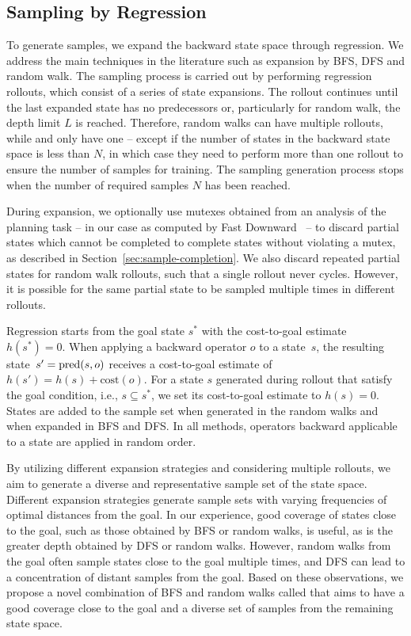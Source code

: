 \subsection{Sampling by Regression}
\label{sec:sampling-generation}

To generate samples, we expand the backward state space through regression. We address the main techniques in the literature such as expansion by BFS, DFS and random walk. The sampling process is carried out by performing regression rollouts, which consist of a series of state expansions. The rollout continues until the last expanded state has no predecessors or, particularly for random walk, the depth limit $L$ is reached. Therefore, random walks can have multiple rollouts, while \bfs and \dfs only have one -- except if the number of states in the backward state space is less than $N$, in which case they need to perform more than one rollout to ensure the number of samples for training. The sampling generation process stops when the number of required samples $N$ has been reached.

During expansion, we optionally use mutexes obtained from an analysis of the planning task -- in our case as computed by Fast Downward~\cite{Helmert/2006} -- to discard partial states which cannot be completed to complete states without violating a mutex, as described in Section~\ref{sec:sample-completion}. We also discard repeated partial states for random walk rollouts, such that a single rollout never cycles. However, it is possible for the same partial state to be sampled multiple times in different rollouts.

Regression starts from the goal state $s^*$ with the cost-to-goal estimate~$h(s^*)=0$. When applying a backward operator $o$ to a state~$s$, the resulting state~$s' = \operatorname{pred}(s, o)$ receives a cost-to-goal estimate of $h(s') = h(s) + \text{cost}(o)$. For a state $s$ generated during rollout that satisfy the goal condition, i.e., $s \subseteq s^*$, we set its cost-to-goal estimate to $h(s) = 0$. States are added to the sample set when generated in the random walks and when expanded in BFS and DFS. In all methods, operators backward applicable to a state are applied in random order.

By utilizing different expansion strategies and considering multiple rollouts, we aim to generate a diverse and representative sample set of the state space. Different expansion strategies generate sample sets with varying frequencies of optimal distances from the goal. In our experience, good coverage of states close to the goal, such as those obtained by BFS or random walks, is useful, as is the greater depth obtained by DFS or random walks. However, random walks from the goal often sample states close to the goal multiple times, and DFS can lead to a concentration of distant samples from the goal. Based on these observations, we propose a novel combination of BFS and random walks called \bfsrw that aims to have a good coverage close to the goal and a diverse set of samples from the remaining state space.

